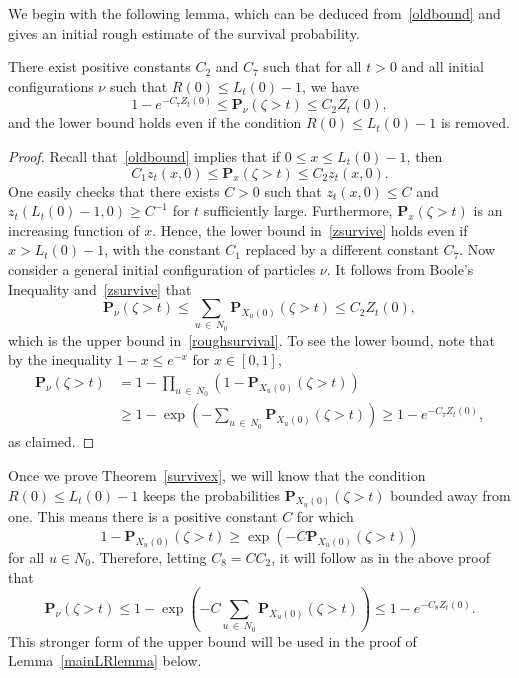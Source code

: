 \documentclass[AHL,Unicode,longabstracts,published]{cedram}
\renewcommand*\P{\mathbf{P}}
\newcommand{\1} {\mathds{1}}
\begin{document}
We begin with the following lemma, which can be deduced from~\eqref{oldbound} and gives an initial rough estimate of the survival probability.

\begin{lemm}\label{survivalgen}
There exist positive constants $C_2$ and $C_7$ such that for all $t > 0$ and all initial configurations $\nu$ such that $R(0) \leq L_t(0) - 1$, we have
\begin{equation}\label{roughsurvival}
1 - e^{-C_7 Z_t(0)} \leq \P_{\nu}(\zeta > t) \leq C_2 Z_t(0),
\end{equation}
and the lower bound holds even if the condition $R(0) \leq L_t(0) - 1$ is removed.
\end{lemm}

\begin{proof}
Recall that~\eqref{oldbound} implies that if $0 \leq x \leq L_t(0) - 1$, then
\begin{equation}\label{zsurvive}
C_1 z_t(x,0) \leq \P_x(\zeta > t) \leq C_2 z_t(x,0).
\end{equation}
One easily checks that there exists $C>0$ such that $z_t(x,0) \le C$ and $z_t(L_t(0)-1,0) \ge C^{-1}$ for $t$ sufficiently large. Furthermore, $\P_x(\zeta > t)$ is an increasing function of $x$. Hence, the lower bound in~\eqref{zsurvive} holds even if $x > L_t(0) - 1$, with the constant $C_1$ replaced by a different constant $C_7$. Now consider a general initial configuration of particles $\nu$. It follows from Boole's Inequality and~\eqref{zsurvive} that
\[
\P_{\nu}(\zeta > t) \leq \sum_{u\,\in\,N_0} \P_{X_u(0)}(\zeta > t) \leq C_2 Z_t(0),
\]
which is the upper bound in~\eqref{roughsurvival}. To see the lower bound, note that by the inequality $1-x\le e^{-x}$ for $x\in [0,1]$,
\begin{align*}
\P_{\nu}(\zeta > t) &= 1 - \prod_{u\,\in\,N_0} \left(1 - \P_{X_u(0)}(\zeta > t)\right) \\
&\geq 1 - \exp \left(- \sum_{u\,\in\,N_0} \P_{X_u(0)}(\zeta > t) \right) \geq 1 - e^{-C_7Z_t(0)},
\end{align*}
as claimed.
\end{proof}

\begin{rema}
Once we prove Theorem~\ref{survivex}, we will know that the condition $R(0) \leq L_t(0) - 1$ keeps the probabilities $\P_{X_u(0)}(\zeta > t)$ bounded away from one. This means there is a positive constant $C$ for which
\[
1 - \P_{X_u(0)}(\zeta > t) \geq \exp\left(-C \P_{X_u(0)}(\zeta > t)\right)
\]
for all $u \in N_0$. Therefore, letting $C_8 = C C_2$, it will follow as in the above proof that
\begin{equation}\label{strongupper}
\P_{\nu}(\zeta > t) \leq 1 - \exp \left(- C \sum_{u\,\in\,N_0} \P_{X_u(0)}(\zeta > t) \right) \leq 1 - e^{-C_8 Z_t(0)}.
\end{equation}
This stronger form of the upper bound will be used in the proof of Lemma~\ref{mainLRlemma} below.
\end{rema}
\end{document}
